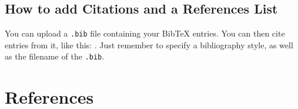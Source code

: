\documentclass[12pt,a4paper]{article}
\begin{document}
\subsection{How to add Citations and a References List}

You can upload a \verb|.bib| file containing your BibTeX entries. You can then cite entries from it, like this: \cite{greenwade93}. Just remember to specify a bibliography style, as well as the filename of the \verb|.bib|.

\section{References}

\printbibliography
\end{document}
